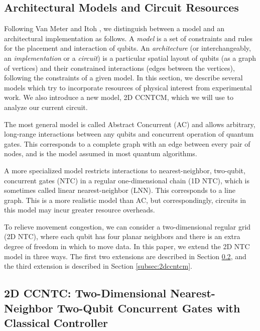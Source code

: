 \documentclass[twoside]{article}
\begin{document}
\subsection{Architectural Models and Circuit Resources}
\label{subsec:models}

Following Van Meter and Itoh \cite{VanMeter2005},
we distinguish between a model and an architectural implementation as follows.
A \emph{model} is a set of constraints and rules for the placement and
interaction of qubits.
An \emph{architecture} (or interchangeably, an \emph{implementation} 
or a \emph{circuit}) is a particular
spatial layout of qubits (as a graph of vertices) and their
constrained interactions (edges between the vertices),
following the constraints of a given model. In this section, we describe
several models which try to incorporate resources of physical interest from
experimental work. We also introduce a new model,
\textsc{2D CCNTCM}, which we will use to analyze our current circuit.

The most general model is called Abstract Concurrent (\textsc{AC})
and allows arbitrary, long-range interactions between any qubits and concurrent
operation of quantum gates.
This corresponds to a complete graph with an edge between every pair of nodes,
and is the model assumed in most quantum algorithms.

A more specialized model restricts interactions to nearest-neighbor, two-qubit,
concurrent gates (\textsc{NTC}) in a regular one-dimensional chain (1D NTC),
which is sometimes called linear nearest-neighbor (\textsc{LNN}).
This corresponds to a line graph. This is a more realistic model than
\textsc{AC}, but correspondingly, circuits in this model may incur greater
resource overheads.

To relieve movement congestion,
we can consider a two-dimensional regular grid
(2D NTC), where each
qubit has four planar neighbors and 
there is an extra degree of freedom
in which to move data.
In this paper, we extend the \textsc{2D NTC} model in three ways.
The first two extensions are described in Section \ref{subsec:2dccntc},
and the third extension is described in Section \ref{subsec:2dccntcm}.

\subsection{\textsc{2D CCNTC}: Two-Dimensional Nearest-Neighbor Two-Qubit Concurrent Gates with Classical Controller}
\label{subsec:2dccntc}
\end{document}
